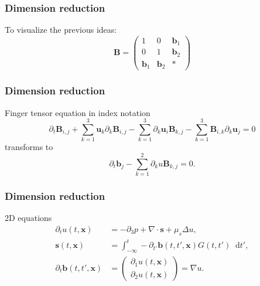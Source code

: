 \documentclass[12pt,a4paper,handout]{beamer}
\theoremstyle{definition}
\theoremstyle{plain}
\newcommand{\bfB}{\bm{B}}
\newcommand{\bfb}{\bm{b}}
\newcommand{\bfs}{\bm{s}}
\newcommand{\bfx}{\bm{x}}
\newcommand{\D}{\mathop{}\!\mathrm{d}}
\begin{document}
\begin{frame}
    \frametitle{Dimension reduction}
    To visualize the previous ideas:
    \begin{equation*}
    \bfB=\begin{pmatrix}
        1&0&\bfb_1\\
        0&1&\bfb_2\\
        \bfb_1&\bfb_2&*
    \end{pmatrix}
    \end{equation*}
\end{frame}
\begin{frame}
    \frametitle{Dimension reduction}
    Finger tensor equation in index notation
    \begin{equation*}
    \partial_t \bm{B}_{i,j}+\sum_{k=1}^3\bm{u}_k\partial_k \bm{B}_{i,j}-\sum_{k=1}^3\partial_k\bm{u}_i\bm{B}_{k,j}-\sum_{k=1}^3\bm{B}_{i,k}\partial_k\bm{u}_j=0
    \end{equation*}
    transforms to
    \begin{equation*}
    \partial_t \bfb_j -\sum_{k=1}^2\partial_ku\bm{B}_{k,j}=0.
    \end{equation*}
\end{frame}
\begin{frame}
    \frametitle{Dimension reduction}
    2D equations 
    \begin{align*}
    \partial_t u(t,\bfx) &= -\partial_3 p +\nabla\cdot \bfs+\mu_s\Delta u,\\
    \bfs(t,\bfx) &=\int_{-\infty}^t-\partial_{t'}\bfb(t,t',\bfx)G(t,t')\D t',\label{eq:s2D}\\
    \partial_t\bfb(t,t',\bfx)&=
    \begin{pmatrix}
    \partial_1 u(t,\bfx)\\\partial_2 u(t,\bfx)
    \end{pmatrix}=\nabla u.
    \end{align*}
\end{frame}
\end{document}
